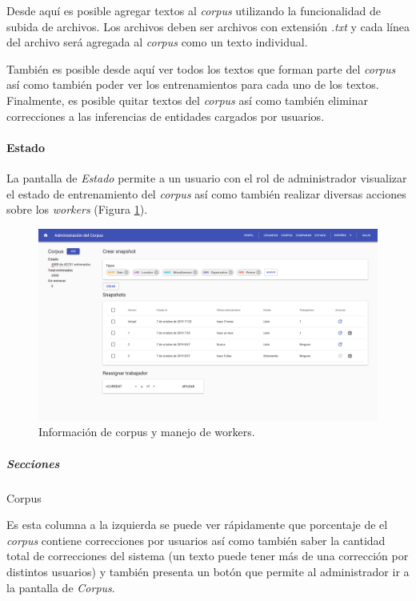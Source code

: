 \documentclass[12pt,a4paper,]{scrartcl}
\let\oldparagraph\paragraph
\renewcommand{\paragraph}[1]{\oldparagraph{#1}\mbox{}}
\let\oldsubparagraph\subparagraph
\renewcommand{\subparagraph}[1]{\oldsubparagraph{#1}\mbox{}}
\begin{document}
Desde aquí es posible agregar textos al \emph{corpus} utilizando la funcionalidad de subida de archivos. Los archivos deben ser archivos con extensión \emph{.txt} y cada línea del archivo será agregada al \emph{corpus} como un texto individual.

También es posible desde aquí ver todos los textos que forman parte del \emph{corpus} así como también poder ver los entrenamientos para cada uno de los textos. Finalmente, es posible quitar textos del \emph{corpus} así como también eliminar correcciones a las inferencias de entidades cargados por usuarios.

\hypertarget{estado}{%
\paragraph{Estado}\label{estado}}

La pantalla de \emph{Estado} permite a un usuario con el rol de administrador visualizar el estado de entrenamiento del \emph{corpus} así como también realizar diversas acciones sobre los \emph{workers} (Figura \ref{fig:logic-status}).

\begin{figure}[H]

{\centering \includegraphics{assets/logic/status.pdf} 

}

\caption{Información de corpus y manejo de workers.}\label{fig:logic-status}
\end{figure}

\hypertarget{secciones}{%
\subparagraph{Secciones}\label{secciones}}

Corpus

Es esta columna a la izquierda se puede ver rápidamente que porcentaje de el \emph{corpus} contiene correcciones por usuarios así como también saber la cantidad total de correcciones del sistema (un texto puede tener más de una corrección por distintos usuarios) y también presenta un botón que permite al administrador ir a la pantalla de \emph{Corpus}.
\end{document}
